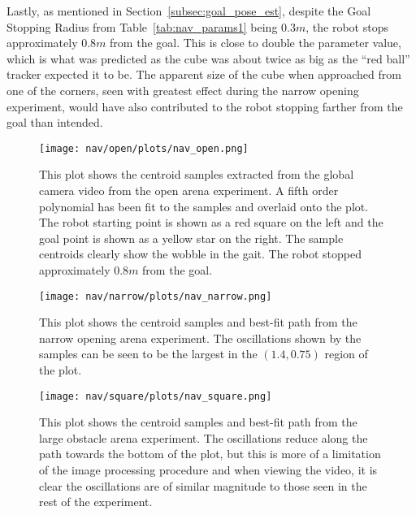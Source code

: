 Lastly, as mentioned in Section~\ref{subsec:goal_pose_est}, despite the Goal Stopping
Radius from Table~\ref{tab:nav_params1} being $0.3 m$, the robot stops approximately
$0.8 m$ from the goal. This is close to double the parameter value, which is what was predicted
as the cube was about twice as big as the ``red ball'' tracker expected it to be.
The apparent size of the cube when approached from one of the corners, seen with greatest
effect during the narrow opening experiment, would have also contributed to the robot
stopping farther from the goal than intended.

\begin{figure}
  \centering
  \texttt{[image: nav/open/plots/nav\_open.png]}
  \caption{This plot shows the centroid samples extracted from the global camera video from
           the open arena experiment. A fifth order polynomial has been fit to the samples
           and overlaid onto the plot.
           The robot starting point is shown as a red square on the left and the goal point 
           is shown as a yellow star on the right.
           The sample centroids clearly show the wobble in the gait.
           The robot stopped approximately $0.8 m$ from the goal.}
  \label{fig:nav_open_plot1}
\end{figure}

\begin{figure}
  \centering
  \texttt{[image: nav/narrow/plots/nav\_narrow.png]}
  \caption{This plot shows the centroid samples and best-fit path from the narrow opening arena experiment. 
           The oscillations shown by the samples can be seen to be the largest in the
           $(1.4, 0.75)$ region of the plot.}
  \label{fig:nav_narrow_plot1}
\end{figure}

\begin{figure}
  \centering
  \texttt{[image: nav/square/plots/nav\_square.png]}
  \caption{This plot shows the centroid samples and best-fit path from the large obstacle arena experiment.
           The oscillations reduce along the path towards the bottom of the plot, but this is more of
           a limitation of the image processing procedure and when viewing the video, it is clear the oscillations
           are of similar magnitude to those seen in the rest of the experiment.}
  \label{fig:nav_square_plot1}
\end{figure}
